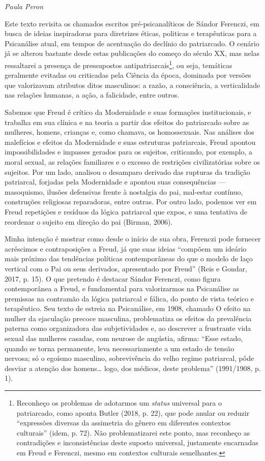 \begin{flushright}
\emph{Paula Peron}
\end{flushright}

Este texto revisita os chamados escritos pré-psicanalíticos de Sándor
Ferenczi, em busca de ideias inspiradoras para diretrizes éticas,
politicas e terapêuticas para a Psicanálise atual, em tempos de
acentuação do declínio do patriarcado. O cenário já se alterou bastante
desde estas publicações do começo do século XX, mas nelas ressaltarei a
presença de pressupostos antipatriarcais\footnote{Reconheço os problemas
  de adotarmos um \emph{status} universal para o patriarcado, como
  aponta Butler (2018, p. 22), que pode anular ou reduzir ``expressões
  diversas da assimetria do gênero em diferentes contextos culturais''
  (idem, p. 72). Não problematizarei este ponto, mas reconheço as
  contradições e inconsistências deste suposto universal, justamente
  encarnadas em Freud e Ferenczi, mesmo em contextos culturais
  semelhantes.}, ou seja, temáticas geralmente evitadas ou criticadas
pela Ciência da época, dominada por versões que valorizavam atributos
ditos masculinos: a razão, a consciência, a verticalidade nas relações
humanas, a ação, a falicidade, entre outros.

Sabemos que Freud é crítico da Modernidade e suas formações
institucionais, e trabalha em sua clínica e na teoria a partir dos
efeitos do patriarcado sobre as mulheres, homens, crianças e, como
chamava, os homossexuais. Nas análises dos malefícios e efeitos da
Modernidade e suas estruturas patriarcais, Freud apontou
impossibilidades e impasses gerados para os sujeitos, criticando, por
exemplo, a moral sexual, as relações familiares e o excesso de
restrições civilizatórias sobre os sujeitos. Por um lado, analisou o
desamparo derivado das rupturas da tradição patriarcal, forjadas pela
Modernidade e apontou suas consequências --- masoquismo, ilusões
defensivas frente à nostalgia do pai, mal-estar contínuo, construções
religiosas reparadoras, entre outras. Por outro lado, podemos ver em
Freud repetições e resíduos da lógica patriarcal que expos, e uma
tentativa de reordenar o sujeito em direção do pai (Birman, 2006).

Minha intenção é mostrar como desde o início de sua obra, Ferenczi pode
fornecer acréscimos e contraposições a Freud, já que suas ideias
``compõem um ideário mais próximo das tendências políticas
contemporâneas do que o modelo de laço vertical com o Pai ou seus
derivados, apresentado por Freud'' (Reis e Gondar, 2017, p. 15). O que
pretendo é destacar Sándor Ferenczi, como figura contemporânea a Freud,
e fundamental para valorizarmos na Psicanálise as premissas na contramão
da lógica patriarcal e fálica, do ponto de vista teórico e terapêutico.
Seu texto de estreia na Psicanálise, em 1908, chamado O efeito na mulher
da ejaculação precoce masculina, problematiza os efeitos da prevalência
paterna como organizadora das subjetividades e, ao descrever a
frustrante vida sexual das mulheres casadas, com neurose de angústia,
afirma: ``Esse estado, quando se torna permanente, leva necessariamente
a um estado de tensão nervosa; só o egoísmo masculino, sobrevivência do
velho regime patriarcal, pôde desviar a atenção dos homens\ldots{} logo, dos
médicos, deste problema'' (1991/1908, p. 1).

